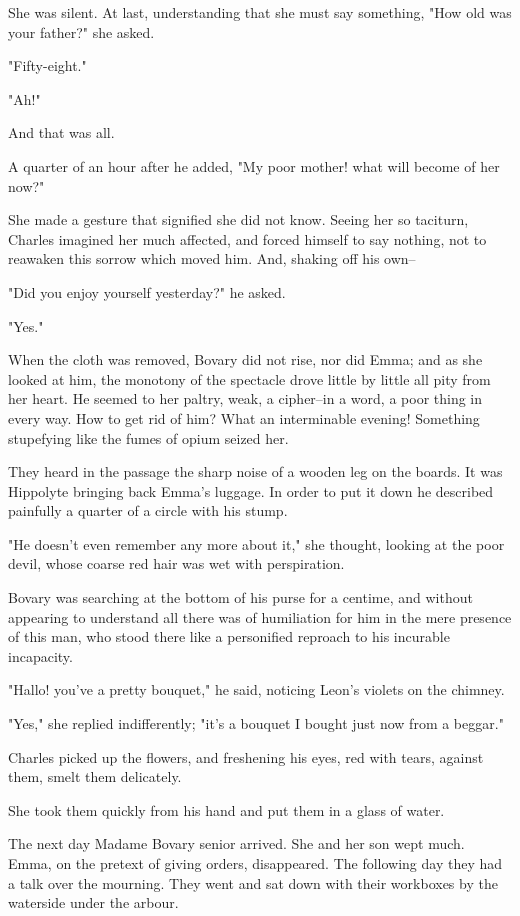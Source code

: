 \documentclass[11pt,twocolumn]{ltugboat}
\begin{document}
She was silent. At last, understanding that she must say something, "How
old was your father?" she asked.

"Fifty-eight."

"Ah!"

And that was all.

A quarter of an hour after he added, "My poor mother! what will become
of her now?"

She made a gesture that signified she did not know. Seeing her so
taciturn, Charles imagined her much affected, and forced himself to say
nothing, not to reawaken this sorrow which moved him. And, shaking off
his own--

"Did you enjoy yourself yesterday?" he asked.

"Yes."

When the cloth was removed, Bovary did not rise, nor did Emma; and as
she looked at him, the monotony of the spectacle drove little by little
all pity from her heart. He seemed to her paltry, weak, a cipher--in
a word, a poor thing in every way. How to get rid of him? What an
interminable evening! Something stupefying like the fumes of opium
seized her.

They heard in the passage the sharp noise of a wooden leg on the boards.
It was Hippolyte bringing back Emma's luggage. In order to put it down
he described painfully a quarter of a circle with his stump.

"He doesn't even remember any more about it," she thought, looking at
the poor devil, whose coarse red hair was wet with perspiration.

Bovary was searching at the bottom of his purse for a centime, and
without appearing to understand all there was of humiliation for him
in the mere presence of this man, who stood there like a personified
reproach to his incurable incapacity.

"Hallo! you've a pretty bouquet," he said, noticing Leon's violets on
the chimney.

"Yes," she replied indifferently; "it's a bouquet I bought just now from
a beggar."

Charles picked up the flowers, and freshening his eyes, red with tears,
against them, smelt them delicately.

She took them quickly from his hand and put them in a glass of water.

The next day Madame Bovary senior arrived. She and her son wept much.
Emma, on the pretext of giving orders, disappeared. The following day
they had a talk over the mourning. They went and sat down with their
workboxes by the waterside under the arbour.
\end{document}
